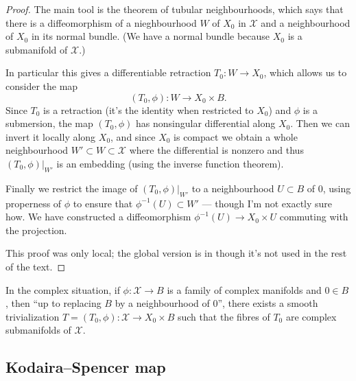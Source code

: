 \begin{proof}
The main tool is the theorem of tubular
neighbourhoods,
which says that there is a diffeomorphism of
a nieghbourhood $W$ of $X_0$ in $\mathcal{X}$
and a neighbourhood of $X_0$ in its normal
bundle.
(We have a normal bundle because $X_0$ is a
submanifold of $\mathcal{X}$.)

In particular this gives a differentiable
retraction
$T_0:W \to X_0$, which allows us to consider
the map
$$
(T_0,\phi):W \to X_0 \times B.
$$
Since $T_0$ is a retraction
(it's the identity when restricted to $X_0$)
and $\phi$ is a submersion,
the map $(T_0,\phi)$ has nonsingular
differential along $X_0$.
Then we can invert it locally along $X_0$,
and since $X_0$ is compact we obtain a whole
neighbourhood $W'\subset W \subset
\mathcal{X}$
where the differential is nonzero and thus
$(T_0,\phi)|_{W'}$ is an embedding
(using the inverse function theorem).

Finally we restrict the image of
$(T_0,\phi)|_{W'}$
to a neighbourhood $U\subset B$ of $0$,
using properness of $\phi$ to ensure
that $\phi^{-1}(U) \subset W'$ --- though I'm
not exactly sure how.
We have constructed a diffeomorphism
$\phi^{-1}(U) \to X_0 \times U$
commuting with the projection.

This proof was only local; the global version
is in \cite{voi} though it's not used in
the rest of the text.
\end{proof}

In the complex situation, if
$\phi:\mathcal{X} \to B$ is a family
of complex manifolds and $0 \in B$, then
``up to replacing $B$ by a neighbourhood of
0'',
there exists a smooth trivialization
$T=(T_0,\phi):\mathcal{X} \to X_0 \times B$
such that the fibres of $T_0$ are complex
submanifolds of $\mathcal{X}$.

\subsection{Kodaira--Spencer map}
\label{subsection-kodaira-spencer}

